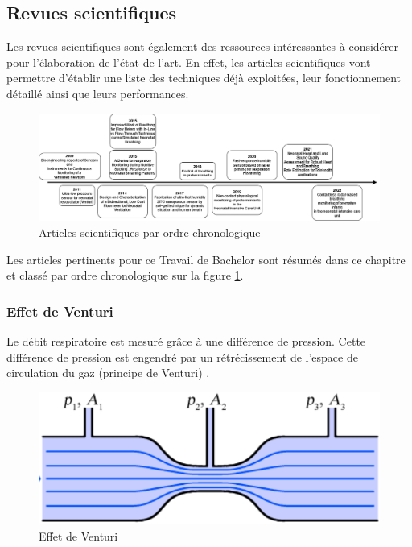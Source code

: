 \subsection{Revues scientifiques}
Les revues scientifiques sont également des ressources intéressantes à considérer pour l'élaboration de l'état de l'art. En effet, les 
articles scientifiques vont permettre d'établir une liste des techniques déjà exploitées, leur fonctionnement détaillé ainsi que leurs 
performances. \\
\begin{figure}[H]
    \hspace{-1cm}
    \includegraphics[scale = 0.45]{images/DRP_Etat_de_l_art.png}
    \caption{Articles scientifiques par ordre chronologique}
    \label{fig:articlesChrono}
\end{figure}

Les articles pertinents pour ce Travail de Bachelor sont résumés dans ce chapitre et classé par ordre chronologique sur la figure 
\ref{fig:articlesChrono}. 

\subsubsection{Effet de Venturi}
Le débit respiratoire est mesuré grâce à une différence de pression. Cette différence de pression est engendré par un rétrécissement de 
l'espace de circulation du gaz (principe de Venturi) \cite{oberg_biomedical_2011}. 
\begin{figure}[H]
    \centering
    \includegraphics[scale = 0.5]{assets/figures/Venturi.png}
    \caption{Effet de Venturi \cite{oberg_biomedical_2011}}
    \label{fig:venturi}
\end{figure}

